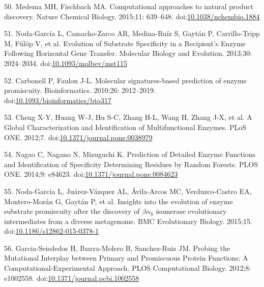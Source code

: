 \documentclass[12pt,twoside]{reedthesis}
\begin{document}
  \hypertarget{ref-medemaux5fcomputationalux5f2015}{}
  50. Medema MH, Fischbach MA. Computational approaches to natural product
  discovery. Nature Chemical Biology. 2015;11: 639--648.
  doi:\href{https://doi.org/10.1038/nchembio.1884}{10.1038/nchembio.1884}
  
  \hypertarget{ref-noda-garciaux5fevolutionux5f2013}{}
  51. Noda-García L, Camacho-Zarco AR, Medina-Ruíz S, Gaytán P,
  Carrillo-Tripp M, Fülöp V, et al. Evolution of Substrate Specificity in
  a Recipient's Enzyme Following Horizontal Gene Transfer. Molecular
  Biology and Evolution. 2013;30: 2024--2034.
  doi:\href{https://doi.org/10.1093/molbev/mst115}{10.1093/molbev/mst115}
  
  \hypertarget{ref-carbonellux5fmolecularux5f2010}{}
  52. Carbonell P, Faulon J-L. Molecular signatures-based prediction of
  enzyme promiscuity. Bioinformatics. 2010;26: 2012--2019.
  doi:\href{https://doi.org/10.1093/bioinformatics/btq317}{10.1093/bioinformatics/btq317}
  
  \hypertarget{ref-chengux5fglobalux5f2012}{}
  53. Cheng X-Y, Huang W-J, Hu S-C, Zhang H-L, Wang H, Zhang J-X, et al. A
  Global Characterization and Identification of Multifunctional Enzymes.
  PLoS ONE. 2012;7.
  doi:\href{https://doi.org/10.1371/journal.pone.0038979}{10.1371/journal.pone.0038979}
  
  \hypertarget{ref-nagaoux5fpredictionux5f2014}{}
  54. Nagao C, Nagano N, Mizuguchi K. Prediction of Detailed Enzyme
  Functions and Identification of Specificity Determining Residues by
  Random Forests. PLOS ONE. 2014;9: e84623.
  doi:\href{https://doi.org/10.1371/journal.pone.0084623}{10.1371/journal.pone.0084623}
  
  \hypertarget{ref-noda-garciaux5finsightsux5f2015}{}
  55. Noda-García L, Juárez-Vázquez AL, Ávila-Arcos MC, Verduzco-Castro
  EA, Montero-Morán G, Gaytán P, et al. Insights into the evolution of
  enzyme substrate promiscuity after the discovery of \(\beta\alpha_8\)
  isomerase evolutionary intermediates from a diverse metagenome. BMC
  Evolutionary Biology. 2015;15.
  doi:\href{https://doi.org/10.1186/s12862-015-0378-1}{10.1186/s12862-015-0378-1}
  
  \hypertarget{ref-garcia-seisdedosux5fprobingux5f2012}{}
  56. Garcia-Seisdedos H, Ibarra-Molero B, Sanchez-Ruiz JM. Probing the
  Mutational Interplay between Primary and Promiscuous Protein Functions:
  A Computational-Experimental Approach. PLOS Computational Biology.
  2012;8: e1002558.
  doi:\href{https://doi.org/10.1371/journal.pcbi.1002558}{10.1371/journal.pcbi.1002558}
  
\end{document}
